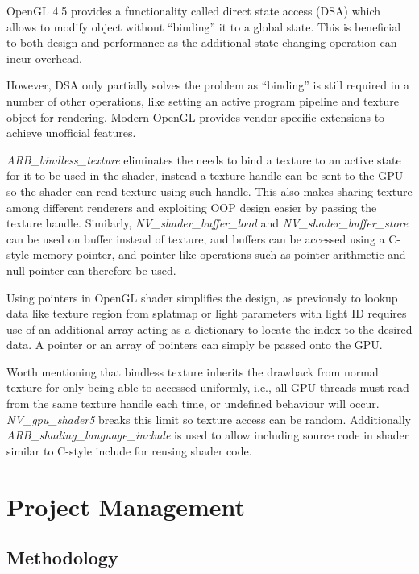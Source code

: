 \documentclass[oneside, a4paper]{report}
\begin{document}
    OpenGL 4.5 provides a functionality called direct state access (DSA) which allows to modify object without ``binding'' it to a global state. This is beneficial to both design and performance as the additional state changing operation can incur overhead.

    However, DSA only partially solves the problem as ``binding'' is still required in a number of other operations, like setting an active program pipeline and texture object for rendering. Modern OpenGL provides vendor-specific extensions to achieve unofficial features.

    \textit{ARB\_bindless\_texture} eliminates the needs to bind a texture to an active state for it to be used in the shader, instead a texture handle can be sent to the GPU so the shader can read texture using such handle. This also makes sharing texture among different renderers and exploiting OOP design easier by passing the texture handle. Similarly, \textit{NV\_shader\_buffer\_load} and \textit{NV\_shader\_buffer\_store} can be used on buffer instead of texture, and buffers can be accessed using a C-style memory pointer, and pointer-like operations such as pointer arithmetic and null-pointer can therefore be used.

    Using pointers in OpenGL shader simplifies the design, as previously to lookup data like texture region from splatmap or light parameters with light ID requires use of an additional array acting as a dictionary to locate the index to the desired data. A pointer or an array of pointers can simply be passed onto the GPU.

    Worth mentioning that bindless texture inherits the drawback from normal texture for only being able to accessed uniformly, i.e., all GPU threads must read from the same texture handle each time, or undefined behaviour will occur. \textit{NV\_gpu\_shader5} breaks this limit so texture access can be random. Additionally \textit{ARB\_shading\_language\_include} is used to allow including source code in shader similar to C-style include for reusing shader code.

    \chapter{Project Management}

    \section{Methodology}
\end{document}
